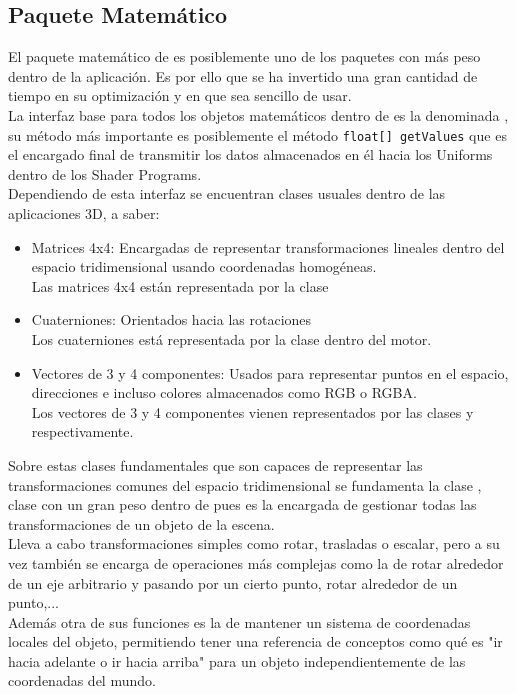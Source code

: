 \subsection{Paquete Matemático}
El paquete matemático de \robotto es posiblemente uno de los paquetes con más peso dentro de la aplicación. Es por ello que se ha invertido una gran cantidad de tiempo en su optimización y en que sea sencillo de usar.\\

La interfaz base para todos los objetos matemáticos dentro de \robotto es la denominada \roreflinearalgebra, su método más importante es posiblemente el método \texttt{float[] getValues} que es el encargado final de transmitir los datos almacenados en él hacia los Uniforms dentro de los Shader Programs.\\

Dependiendo de esta interfaz se encuentran clases usuales dentro de las aplicaciones 3D, a saber:

\begin{itemize}
\item Matrices 4x4: Encargadas de representar transformaciones lineales dentro del espacio tridimensional usando coordenadas homogéneas.\\
Las matrices 4x4 están representada por la clase \rorefmatrix
\item Cuaterniones: Orientados hacia las rotaciones\\
Los cuaterniones está representada por la clase \rorefquaternion dentro del motor.
\item Vectores de 3 y 4 componentes: Usados para representar puntos en el espacio, direcciones e incluso colores almacenados como RGB o RGBA.\\
Los vectores de 3 y 4 componentes vienen representados por las clases \rorefvectortresf y \rorefvectorcuatrof respectivamente.
\end{itemize}

Sobre estas clases fundamentales que son capaces de representar las transformaciones comunes del espacio tridimensional se fundamenta la clase \roreftransform, clase con un gran peso dentro de \robotto pues es la encargada de gestionar todas las transformaciones de un objeto de la escena.\\
Lleva a cabo transformaciones simples como rotar, trasladas o escalar, pero a su vez también se encarga de operaciones más complejas como la de rotar alrededor de un eje arbitrario y pasando por un cierto punto, rotar alrededor de un punto,...\\
Además otra de sus funciones es la de mantener un sistema de coordenadas locales del objeto, permitiendo tener una referencia de conceptos como qué es "ir hacia adelante o ir hacia arriba" para un objeto independientemente de las coordenadas del mundo.\\

